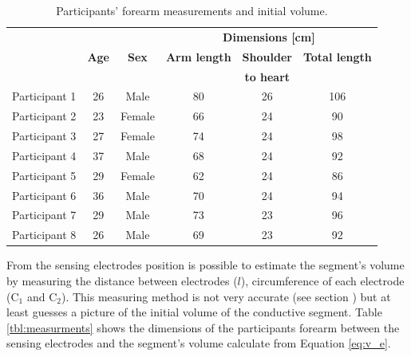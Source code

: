\begin{table}[htbp] %
	\caption{Participants' forearm measurements and initial volume.}
	\label{tbl:physiological}
	\centering
	\begin{tabular}{lcc|ccc}
		\toprule
		&              &              &         \multicolumn{3}{c}{\textbf{Dimensions [\si{\cm}]}}         \\
		& \textbf{Age} & \textbf{Sex} & \textbf{Arm length} & \textbf{Shoulder} & \textbf{Total length} \\
		&              &              &                     &  \textbf{to heart}   &                       \\ \midrule
		Participant 1 &      26      &     Male     &         80          &          26          &          106          \\
		Participant 2 &      23      &    Female    &         66          &          24          &          90           \\
		Participant 3 &      27      &    Female    &         74          &          24          &          98           \\
		Participant 4 &      37      &     Male     &         68          &          24          &          92           \\
		Participant 5 &      29      &    Female    &         62          &          24          &          86           \\
		Participant 6 &      36      &     Male     &         70          &          24          &          94           \\
		Participant 7 &      29      &     Male     &         73          &          23          &          96           \\
		Participant 8 &      26      &     Male     &         69          &          23          &          92           \\ \bottomrule
	\end{tabular}
\end{table}

From the sensing electrodes position is possible to estimate the segment's volume by measuring the distance between electrodes ($l$), circumference of each electrode (C$_1$ and C$_2$).  This measuring method is not very accurate (see section ) but at least guesses a picture of the initial volume of the conductive segment. Table \ref{tbl:measurments} shows the dimensions of the participants forearm between the sensing electrodes and the segment's volume calculate from Equation \ref{eq:v_e}.

